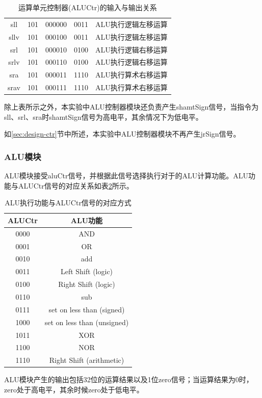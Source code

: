 \documentclass[UTF8]{ctexart}
\begin{document}
\begin{table}[htbp]
\begin{tabular}{|c|c|c|c|c|}
    sll              & 101   & 000000 & 0011   & ALU执行逻辑左移运算   \\
    sllv             & 101   & 000100 & 0011   & ALU执行逻辑左移运算   \\
    srl              & 101   & 000010 & 0100   & ALU执行逻辑右移运算   \\
    srlv             & 101   & 000110 & 0100   & ALU执行逻辑右移运算   \\
    sra              & 101   & 000011 & 1110   & ALU执行算术右移运算   \\
    srav             & 101   & 000111 & 1110   & ALU执行算术右移运算   \\ 
    \hline
    \end{tabular}
    \caption{运算单元控制器(ALUCtr)的输入与输出关系}
    \label{tab:aluctr-in-out}
    \end{table}\par
    除上表所示之外，本实验中ALU控制器模块还负责产生shamtSign信号，当指令为sll、srl、sra时shamtSign信号为高电平，其余情况下为低电平。\par
    如\ref{sec:design-ctr}节中所述，本实验中ALU控制器模块不再产生jrSign信号。

\subsubsection{ALU模块}
    ALU模块接受aluCtr信号，并根据此信号选择执行对于的ALU计算功能。ALU功能与ALUCtr信号的对应关系如表\ref{tab:aluctr-sig-name}所示。
    \begin{table}[htbp]
    \centering
    \begin{tabular}{|c|c|}
        \hline
        ALUCtr & ALU功能 \\
        \hline
        0000 & AND \\
        0001 & OR \\
        0010 & add \\
        0011 & Left Shift (logic) \\
        0100 & Right Shift (logic) \\
        0110 & sub \\
        0111 & set on less than (signed) \\
        1000 & set on less than (unsigned) \\
        1011 & XOR \\
        1100 & NOR \\
        1110 & Right Shift (arithmetic) \\
        \hline
    \end{tabular}
    \caption{ALU执行功能与ALUCtr信号的对应方式}
    \label{tab:aluctr-sig-name}
    \end{table}\par
    ALU模块产生的输出包括32位的运算结果以及1位zero信号；当运算结果为0时，zero处于高电平，其余时候zero处于低电平。
\end{document}

